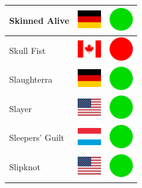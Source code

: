 \documentclass[12pt, a4paper, twoside]{report}
\begin{document}
\begin{center}
\begin{longtable}{|p{5cm}|p{2cm}|p{2cm}|}
Skinned Alive & \includegraphics[width=1cm]{4x3/de} & \includegraphics[width=1cm]{likes/y} \\ \hline
Skull Fist & \includegraphics[width=1cm]{4x3/ca} & \includegraphics[width=1cm]{likes/n} \\ \hline
Slaughterra & \includegraphics[width=1cm]{4x3/de} & \includegraphics[width=1cm]{likes/y} \\ \hline
Slayer & \includegraphics[width=1cm]{4x3/us} & \includegraphics[width=1cm]{likes/y} \\ \hline
Sleepers' Guilt & \includegraphics[width=1cm]{4x3/lu} & \includegraphics[width=1cm]{likes/y} \\ \hline
Slipknot & \includegraphics[width=1cm]{4x3/us} & \includegraphics[width=1cm]{likes/y} \\ \hline

\end{longtable}
\end{center}
\end{document}
